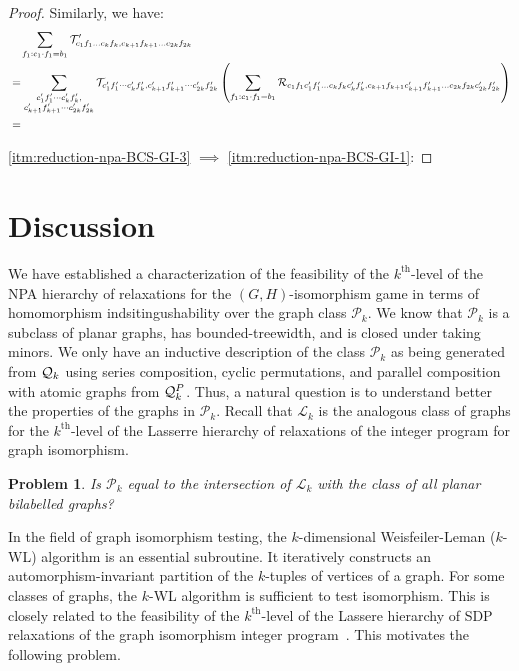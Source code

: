 \documentclass[11pt,a4paper]{article}
\theoremstyle{plain}
\newtheorem{prob}[thm]{Problem}
\theoremstyle{remark}
\theoremstyle{definition}
\begin{document}
\begin{proof}
Similarly, we have: 
\begin{align*}
    & \quad \sum_{f_1: c_1\cdot f_1 = b_1}{\mathcal T}'_{c_1f_1\dots c_kf_k, c_{k+1}f_{k+1} \dots c_{2k}f_{2k}}\\
    & = \sum_{\substack{c_1'f_1' \cdots c_{k}'f_{k}', \\ c_{k+1}'f_{k+1}' \cdots c_{2k}'f_{2k}'}} {\mathcal T}_{c_1'f_1' \cdots c_{k}'f_{k}', c_{k+1}'f_{k+1}' \cdots c_{2k}'f_{2k}'} \left(\sum_{f_1: c_1\cdot f_1 = b_1}{\mathcal R}_{c_1f_1c_1'f_1' \dots c_kf_kc_k'f_k', c_{k+1}f_{k+1}c_{k+1}'f_{k+1}' \dots c_{2k}f_{2k}c_{2k}'f_{2k}'}\right)\\
    & = 
\end{align*}
    
    \ref{itm:reduction-npa-BCS-GI-3} $\implies$ \ref{itm:reduction-npa-BCS-GI-1}:
\end{proof}
\fi

\section{Discussion}\label{sec:conclusion}

We have established a characterization of the feasibility of the $k^{\text{th}}$-level of the NPA hierarchy of relaxations for the $(G, H)$-isomorphism game in terms of homomorphism indsitingushability over the graph class $\mathcal{P}_k$.
We know that $\mathcal{P}_k$ is a subclass of planar graphs, has bounded-treewidth, and is closed under taking minors.
We only have an inductive description of the class $\mathcal{P}_k$ as being generated from ${\mathcal Q}_k$ using series composition, cyclic permutations, and parallel composition with atomic graphs from ${\mathcal Q}_k^P$. Thus, a natural question is to understand better the properties of the graphs in $\mathcal{P}_k$.
Recall that $\mathcal{L}_k$ is the analogous class of graphs for the $k^{\text{th}}$-level of the Lasserre hierarchy of relaxations of the integer program for graph isomorphism.

\begin{prob}
  Is $\mathcal{P}_k$ equal to the intersection of $\mathcal{L}_k$ with the class of all planar bilabelled graphs?
\end{prob}

In the field of graph isomorphism testing, the $k$-dimensional Weisfeiler-Leman ($k$-WL) algorithm is an essential subroutine.
It iteratively constructs an automorphism-invariant partition of the $k$-tuples of vertices of a graph.
For some classes of graphs, the $k$-WL algorithm is sufficient to test isomorphism.
This is closely related to the feasibility of the $k^{\text{th}}$-level of the Lassere hierarchy of SDP relaxations of the graph isomorphism integer program~\cite{roberson-seppelt-arxiv}.
This motivates the following problem.
\end{document}
